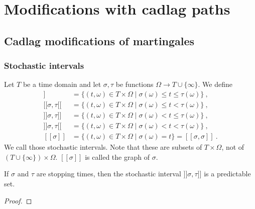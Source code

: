 \chapter{Modifications with cadlag paths}

\section{Cadlag modifications of martingales}

\subsection{Stochastic intervals}


\begin{definition}\label{def:stochasticInterval}
Let $T$ be a time domain and let $\sigma, \tau$ be functions $\Omega \to T \cup \{\infty\}$.
We define
\begin{align*}
  [\![\sigma, \tau]\!]
  &= \{(t, \omega) \in T \times \Omega \mid \sigma(\omega) \le t \le \tau(\omega)\}
  \:, \\
  [\![\sigma, \tau[\![
  &= \{(t, \omega) \in T \times \Omega \mid \sigma(\omega) \le t < \tau(\omega)\}
  \:, \\
  ]\!]\sigma, \tau]\!]
  &= \{(t, \omega) \in T \times \Omega \mid \sigma(\omega) < t \le \tau(\omega)\}
  \:, \\
  ]\!]\sigma, \tau[\![
  &= \{(t, \omega) \in T \times \Omega \mid \sigma(\omega) < t < \tau(\omega)\}
  \:, \\
  [\![\sigma]\!]
  &= \{(t, \omega) \in T \times \Omega \mid \sigma(\omega) = t\} = [\![\sigma, \sigma]\!]
  \:.
\end{align*}
We call those stochastic intervals. Note that these are subsets of $T \times \Omega$, not of $ (T \cup \{\infty\}) \times \Omega$.
$[\![\sigma]\!]$ is called the graph of $\sigma$.
\end{definition}


\begin{lemma}\label{lem:predictable_stochasticInterval}
If $\sigma$ and $\tau$ are stopping times, then the stochastic interval $]\!]\sigma, \tau]\!]$ is a predictable set.
\end{lemma}

\begin{proof}

\end{proof}


